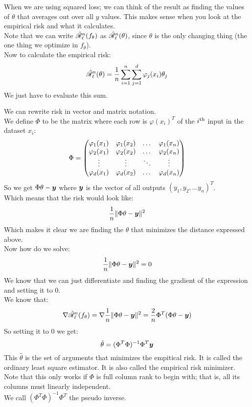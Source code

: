 \documentclass[12pt]{article}
\begin{document}
When we are using squared loss; we can think
of the result as finding the values of $\theta$
that averages out over all $y$ values.
This makes sense when you look at the
empirical risk and what it calculates. \\

Note that we can write $\hat{\mathscr{R}}_{\ell}^{n}
(f_\theta)$ as $\hat{\mathscr{R}}_{\ell}^{n}
(\theta)$,
since $\theta$ is the only changing thing
(the one thing we optimize in $f_\theta$). \\

Now to calculate the empirical risk:
\[ \hat{\mathscr{R}}_{\ell}^{n} (\theta)
= \dfrac{1}{n}\sum_{i=1}^{n}
\sum_{j=1}^{d} \varphi_j(x_i) \theta_j \]
We just have to evaluate this sum.

We can rewrite risk in vector and matrix
notation. \\
We define $\Phi$ to be the matrix
where each row is $\varphi(x_i)^T$
of the $i^{\text{th}}$ input in the dataset $x_i$:
\[ \Phi = \begin{pmatrix} 
\varphi_1(x_1) & \varphi_1(x_2) & \dots & \varphi_1(x_n) \\
\varphi_2(x_1) & \varphi_2(x_2) & \dots & \varphi_2(x_n) \\
\vdots & \vdots & \ddots & \vdots \\
\varphi_d(x_1) & \varphi_d(x_2) & \dots & \varphi_d(x_n) \end{pmatrix} \]
So we get $\Phi \theta - \boldsymbol{y}$
where $\boldsymbol{y}$ is the vector of all
outputs $(y_1, y_2, \dots y_n)^T$. \\
Which means that the risk would look like:
\[ \dfrac{1}{n}\|\Phi \theta - \boldsymbol{y}\|^2 \]
Which makes it clear we are finding the $\theta$
that minimizes the distance expressed above. \\

Now how do we solve:
\[ \dfrac{1}{n}\|\Phi \theta - \boldsymbol{y}\|^2 = 0 \]
We know that we can just differentiate and finding
the gradient of the expression and setting
it to $0$. \\
We know that:
\[ \nabla \hat{\mathscr{R}}_{\ell}^{n}(f_{\theta}) 
= \nabla \dfrac{1}{n}
\|\Phi \theta - \boldsymbol{y}\|^2 
= \dfrac{2}{n}\Phi^T(\Phi \theta - \boldsymbol{y}) \]
So setting it to $0$ we get:
\[ \hat{\theta} = (\Phi^T\Phi)^{-1} \Phi^T 
\boldsymbol{y} \]
This $\hat{\theta}$ is the set of arguments
that minimizes the empitical risk.
It is called the ordinary least square
estimator.
It is also called the empirical risk minimizer. \\
Note that this only works if $\Phi$
is full column rank to begin with;
that is, all its columns must linearly
independent. \\
We call $(\Phi^T\Phi)^{-1} \Phi^T$
the pseudo inverse. \\
\end{document}
